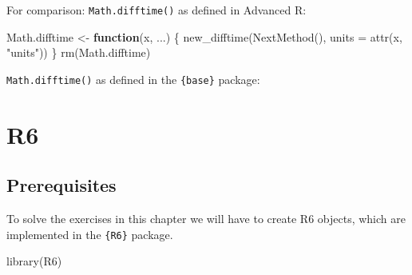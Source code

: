 \documentclass[
]{krantz}
\makeatletter
\newenvironment{Shaded}{\begin{snugshade}}{\end{snugshade}}
\newcommand{\CommentTok}[1]{\textcolor[rgb]{0.56,0.35,0.01}{\textit{#1}}}
\newcommand{\ControlFlowTok}[1]{\textcolor[rgb]{0.13,0.29,0.53}{\textbf{#1}}}
\newcommand{\DataTypeTok}[1]{\textcolor[rgb]{0.13,0.29,0.53}{#1}}
\newcommand{\KeywordTok}[1]{\textcolor[rgb]{0.13,0.29,0.53}{\textbf{#1}}}
\newcommand{\NormalTok}[1]{#1}
\newcommand{\StringTok}[1]{\textcolor[rgb]{0.31,0.60,0.02}{#1}}
\newenvironment{kframe}{%
\medskip{}
\setlength{\fboxsep}{.8em}
 \def\at@end@of@kframe{}%
 \ifinner\ifhmode%
  \def\at@end@of@kframe{\end{minipage}}%
  \begin{minipage}{\columnwidth}%
 \fi\fi%
 \def\FrameCommand##1{\hskip\@totalleftmargin \hskip-\fboxsep
 \colorbox{shadecolor}{##1}\hskip-\fboxsep
     \hskip-\linewidth \hskip-\@totalleftmargin \hskip\columnwidth}%
 \MakeFramed {\advance\hsize-\width
   \@totalleftmargin\z@ \linewidth\hsize
   \@setminipage}}%
 {\par\unskip\endMakeFramed%
 \at@end@of@kframe}
\renewenvironment{Shaded}{\begin{kframe}}{\end{kframe}}
\renewcommand{\KeywordTok} [1]{\textcolor[rgb]{0.00,0.44,0.13}{{#1}}}
\renewcommand{\DataTypeTok}[1]{\textcolor[rgb]{0.56,0.13,0.00}{{#1}}}
\renewcommand{\StringTok}  [1]{\textcolor[rgb]{0.25,0.44,0.63}{{#1}}}
\renewcommand{\CommentTok} [1]{\textcolor[rgb]{0.38,0.63,0.69}{{#1}}}
\renewcommand{\NormalTok}  [1]{{#1}}
\makeatother
\begin{document}
For comparison: \texttt{Math.difftime()} as defined in Advanced R:

\begin{Shaded}
\begin{Highlighting}[]
\NormalTok{Math.difftime <-}\StringTok{ }\ControlFlowTok{function}\NormalTok{(x, ...) \{}
  \KeywordTok{new_difftime}\NormalTok{(}\KeywordTok{NextMethod}\NormalTok{(), }\DataTypeTok{units =} \KeywordTok{attr}\NormalTok{(x, }\StringTok{"units"}\NormalTok{))}
\NormalTok{\}}
\KeywordTok{rm}\NormalTok{(Math.difftime)}
\end{Highlighting}
\end{Shaded}

\texttt{Math.difftime()} as defined in the \texttt{\{base\}} package:

\begin{Shaded}
\end{Shaded}

\hypertarget{r6}{%
\chapter{R6}\label{r6}}

\hypertarget{prerequisites-7}{%
\section*{Prerequisites}\label{prerequisites-7}}


To solve the exercises in this chapter we will have to create R6 objects, which are implemented in the \texttt{\{R6\}} package.

\begin{Shaded}
\begin{Highlighting}[]
\KeywordTok{library}\NormalTok{(R6)}
\end{Highlighting}
\end{Shaded}
\end{document}
